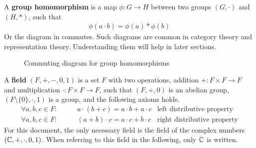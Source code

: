 A \textbf{group homomorphism} is a map $\phi: G \to H$ between two groups $(G, \cdot)$ and $(H, *)$, such that
\begin{align}
    \phi(a \cdot b) = \phi(a) * \phi(b)
\end{align}
Or the diagram in  commutes.
Such diagrams are common in category theory and representation theory.
Understanding them will help in later sections.
\begin{figure}[h]
    \centering
    \caption{Commuting diagram for group homomorphisms}
    \label{fig:fundamentals.groups.hom-cd}
\end{figure}

A \textbf{field} $(F, +, -, 0, 1)$ is a set $F$ with two operations, addition $+: F \times F \to F$ and multiplication $\cdot: F \times F \to F$, such that $(F, +, 0)$ is an abelian group, $(F \setminus \{0\}, \cdot, 1)$ is a group, and the following axioms holds.
\begin{subequations}
\begin{align}
    \forall a, b, c \in F: \qquad & a \cdot (b + c) = a \cdot b + a \cdot c & \text{left distributive property} \\
    \forall a, b, c \in F: \qquad & (a + b) \cdot c = a \cdot c + b \cdot c & \text{right distributive property}
\end{align}
\end{subequations}
For this document, the only necessary field is the field of the complex numbers $(\mathbb{C}, +, \cdot, 0, 1)$.
When referring to this field in the following, only $\mathbb{C}$ is written.
